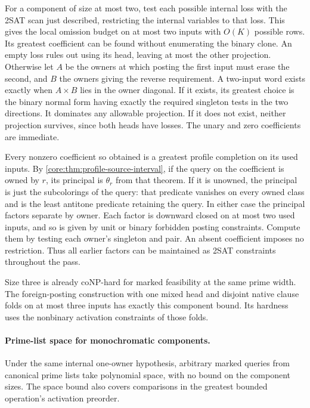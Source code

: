 For a component of size at most two, test each
possible internal loss with the 2SAT scan just
described, restricting the internal variables to
that loss. This gives the local omission budget
on at most two inputs with $O(K)$ possible rows.
Its greatest coefficient can be found without
enumerating the binary clone. An empty loss rules
out using its head, leaving at most the other
projection. Otherwise let $A$ be the owners
at which posting the first input must erase the
second, and $B$ the owners giving the reverse
requirement. A two-input word exists exactly when
$A\times B$ lies in the owner diagonal. If it
exists, its greatest choice is the binary normal
form having exactly the required singleton tests
in the two directions. It dominates any allowable
projection. If it does not exist, neither
projection survives, since both heads have losses.
The unary and zero coefficients are immediate.

Every nonzero coefficient so obtained is a
greatest profile completion on its used inputs.
By \cref{core:thm:profile-source-interval}, if the
query on the coefficient is owned by $r$, its
principal is $\theta_r$ from that theorem.
If it is unowned, the principal is just the
subcolorings of the query: that predicate vanishes
on every owned class and is the least antitone
predicate retaining the query. In either case
the principal factors separate by owner. Each
factor is downward closed on at most two used
inputs, and so is given by unit or binary
forbidden posting constraints. Compute them by
testing each owner's singleton and pair.
An absent coefficient imposes no restriction.
Thus all earlier factors can be maintained as
2SAT constraints throughout the pass.

Size three is already coNP-hard for marked
feasibility at the same prime width. The
foreign-posting construction with one mixed
head and disjoint native clause folds on at
most three inputs has exactly this component
bound. Its hardness uses the nonbinary
activation constraints of those folds.

\paragraph{Prime-list space for monochromatic components.}
Under the same internal one-owner hypothesis, arbitrary marked
queries from canonical prime lists take polynomial space, with
no bound on the component sizes. The space bound also covers
comparisons in the greatest bounded operation's activation
preorder.

